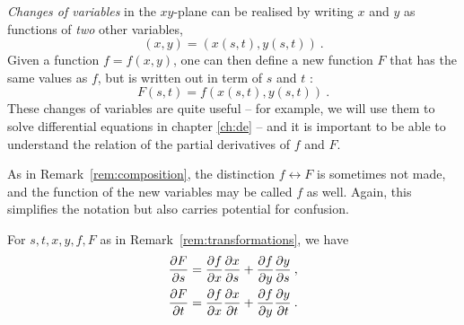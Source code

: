 \begin{remark}
\label{rem:transformations}
\emph{Changes of variables} in the $xy$-plane can be realised by writing $x$ and $y$ as functions of \emph{two} other variables,
\[ (x,y) = (x(s,t),y(s,t)) \:. \]
Given a function $f=f(x,y)$, one can then define a new function $F$ that has the same values as $f$, but is written out in term of $s$ and $t$ :
\[F(s,t) = f(x(s,t),y(s,t)) \:. \]
These changes of variables are quite useful -- for example, we will use them to solve differential equations in chapter \ref{ch:de} -- and it is important to be able to understand the relation of the partial derivatives of $f$ and $F$.

As in Remark~\ref{rem:composition}, the distinction $f \leftrightarrow F$ is sometimes not made, and the function of the new variables may be called $f$ as well. Again, this simplifies the notation but also carries potential for confusion. 
\end{remark}

\begin{theorem}
\label{thm:CRII}
For $s,t,x,y,f,F$ as in Remark~\ref{rem:transformations}, we have
\begin{equation*}
\begin{split}
\displaystyle{\frac{\partial F}{\partial s}} & = \displaystyle{\frac{\partial f}{\partial x}}\displaystyle{\frac{\partial x}{\partial s}} + \displaystyle{\frac{\partial f}{\partial y}}\displaystyle{\frac{\partial y}{\partial s}} \:, \\
\displaystyle{\frac{\partial F}{\partial t}} & = \displaystyle{\frac{\partial f}{\partial x}}\displaystyle{\frac{\partial x}{\partial t}} + \displaystyle{\frac{\partial f}{\partial y}}\displaystyle{\frac{\partial y}{\partial t}} \:.
\end{split}
\end{equation*}
\end{theorem}

